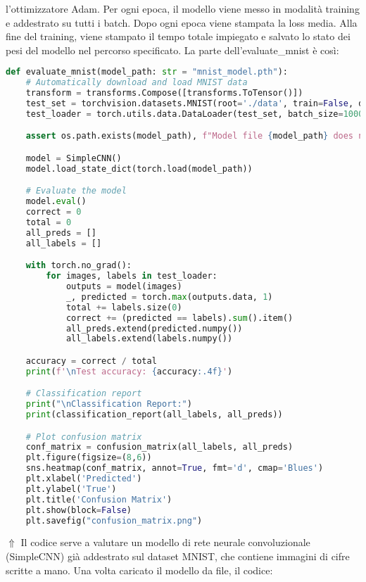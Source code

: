 \documentclass[a4paper,12pt]{article}
\begin{document}
l'ottimizzatore Adam. Per ogni epoca, il modello viene messo in modalità training e addestrato su tutti i batch. Dopo ogni epoca viene stampata la loss media. Alla fine del training, viene stampato il tempo totale impiegato e salvato lo stato dei pesi del modello nel percorso specificato.
\newline
\newline 
La parte dell'evaluate\_mnist è così:
\begin{lstlisting}[language=Python, basicstyle=\ttfamily\footnotesize, breaklines=true, frame=single]
def evaluate_mnist(model_path: str = "mnist_model.pth"):
    # Automatically download and load MNIST data
    transform = transforms.Compose([transforms.ToTensor()])
    test_set = torchvision.datasets.MNIST(root='./data', train=False, download=True, transform=transform)
    test_loader = torch.utils.data.DataLoader(test_set, batch_size=1000, shuffle=False)

    assert os.path.exists(model_path), f"Model file {model_path} does not exist."

    model = SimpleCNN()
    model.load_state_dict(torch.load(model_path))

    # Evaluate the model
    model.eval()
    correct = 0
    total = 0
    all_preds = []
    all_labels = []

    with torch.no_grad():
        for images, labels in test_loader:
            outputs = model(images)
            _, predicted = torch.max(outputs.data, 1)
            total += labels.size(0)
            correct += (predicted == labels).sum().item()
            all_preds.extend(predicted.numpy())
            all_labels.extend(labels.numpy())

    accuracy = correct / total
    print(f'\nTest accuracy: {accuracy:.4f}')

    # Classification report
    print("\nClassification Report:")
    print(classification_report(all_labels, all_preds))

    # Plot confusion matrix
    conf_matrix = confusion_matrix(all_labels, all_preds)
    plt.figure(figsize=(8,6))
    sns.heatmap(conf_matrix, annot=True, fmt='d', cmap='Blues')
    plt.xlabel('Predicted')
    plt.ylabel('True')
    plt.title('Confusion Matrix')
    plt.show(block=False)
    plt.savefig("confusion_matrix.png")
\end{lstlisting}
$\Uparrow$ Il codice serve a valutare un modello di rete neurale convoluzionale (SimpleCNN) già addestrato sul dataset MNIST, che contiene immagini di cifre scritte a mano. Una volta caricato il modello da file, il codice:
\end{document}
